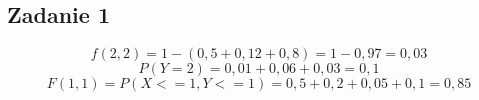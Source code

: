 \subsection{Zadanie 1}

$$
f(2,2) = 1 - (0,5 + 0,12 + 0,8) = 1 - 0,97 = 0,03
$$
$$
P(Y = 2) = 0,01 + 0,06 + 0,03 = 0,1
$$
$$
F(1,1) = P(X <= 1, Y <= 1) = 0,5 + 0,2 + 0,05 + 0,1 = 0,85
$$
